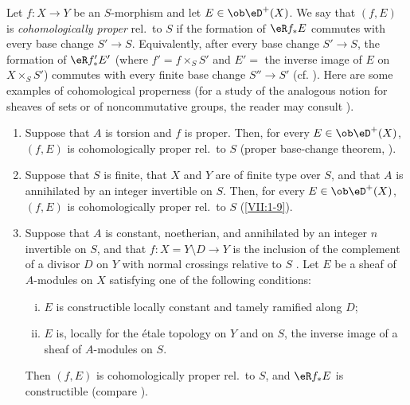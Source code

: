 Let $f:X\to Y$ be an $S$-morphism and let $E\in\ob\eD^+(X)$. We say that
$(f,E)$ is \emph{cohomologically proper} rel.\ to $S$ if the formation of
$\eR f_\ast E$ commutes with every base change $S'\to S$. Equivalently, after
every base change $S'\to S$, the formation of $\eR f_\ast' E'$ (where
$f'=f\times_S S'$ and $E'=$ the inverse image of $E$ on $X\times_S S'$)
commutes with every finite base change $S'' \to S'$ (cf.
\cite[XII 6.1]{sga4}). Here are some examples of cohomological properness
(for a study of the analogous notion for sheaves of sets or of
noncommutative groups, the reader may consult \cite[XIII]{sga1}).
\begin{enumerate}[{1.3.}1.]
  \item Suppose that $A$ is torsion and $f$ is proper. Then, for every
    $E\in\ob\eD^+(X)$, $(f,E)$ is cohomologically proper rel.\ to $S$
    (proper base-change theorem, \cite[XII 5.1]{sga4}).
  \item Suppose that $S$ is finite, that $X$ and $Y$ are of finite type over
    $S$, and that $A$ is annihilated by an integer invertible on $S$. Then,
    for every $E\in\ob\eD^+(X)$, $(f,E)$ is cohomologically proper rel.\ to
    $S$ (\ref{VII:1-9}).
  \item Suppose that $A$ is constant, noetherian, and annihilated by an
    integer $n$ invertible on $S$, and that
    $f:X=Y\setminus D\to Y$ is the inclusion of the complement of a divisor
    $D$ on $Y$ with normal crossings relative to $S$
    \cite[XIII 2.1]{sga1}. Let $E$ be a sheaf of $A$-modules on $X$ satisfying
    one of the following conditions:
    \begin{enumerate}[(i)]
      \item $E$ is constructible locally constant and tamely ramified along
        $D$;
      \item $E$ is, locally for the étale topology on $Y$ and on $S$, the
        inverse image of a sheaf of $A$-modules on $S$.
    \end{enumerate}
    Then $(f,E)$ is cohomologically proper rel.\ to $S$, and $\eR f_\ast E$
    is constructible (compare \cite[XIII 2.4]{sga1}).
\end{enumerate} 

